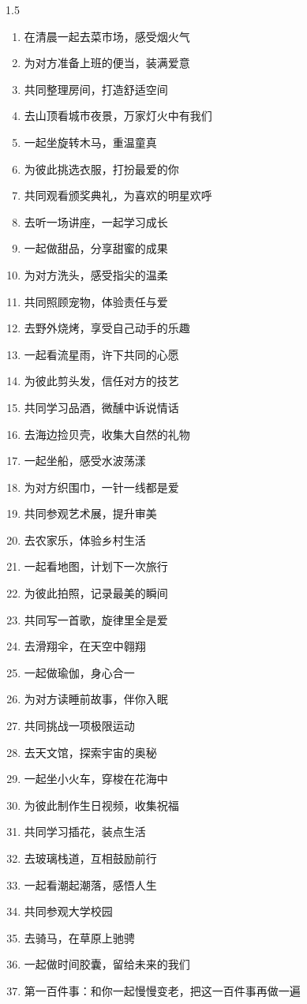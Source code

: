 \begin{spacing}{1.5}
\begin{enumerate}
    \item 在清晨一起去菜市场，感受烟火气
    \item 为对方准备上班的便当，装满爱意
    \item 共同整理房间，打造舒适空间
    \item 去山顶看城市夜景，万家灯火中有我们
    \item 一起坐旋转木马，重温童真
    \item 为彼此挑选衣服，打扮最爱的你
    \item 共同观看颁奖典礼，为喜欢的明星欢呼
    \item 去听一场讲座，一起学习成长
    \item 一起做甜品，分享甜蜜的成果
    \item 为对方洗头，感受指尖的温柔
    \item 共同照顾宠物，体验责任与爱
    \item 去野外烧烤，享受自己动手的乐趣
    \item 一起看流星雨，许下共同的心愿
    \item 为彼此剪头发，信任对方的技艺
    \item 共同学习品酒，微醺中诉说情话
    \item 去海边捡贝壳，收集大自然的礼物
    \item 一起坐船，感受水波荡漾
    \item 为对方织围巾，一针一线都是爱
    \item 共同参观艺术展，提升审美
    \item 去农家乐，体验乡村生活
    \item 一起看地图，计划下一次旅行
    \item 为彼此拍照，记录最美的瞬间
    \item 共同写一首歌，旋律里全是爱
    \item 去滑翔伞，在天空中翱翔
    \item 一起做瑜伽，身心合一
    \item 为对方读睡前故事，伴你入眠
    \item 共同挑战一项极限运动
    \item 去天文馆，探索宇宙的奥秘
    \item 一起坐小火车，穿梭在花海中
    \item 为彼此制作生日视频，收集祝福
    \item 共同学习插花，装点生活
    \item 去玻璃栈道，互相鼓励前行
    \item 一起看潮起潮落，感悟人生
    \item 共同参观大学校园
    \item 去骑马，在草原上驰骋
    \item 一起做时间胶囊，留给未来的我们
    \item 第一百件事：和你一起慢慢变老，把这一百件事再做一遍
\end{enumerate}
\end{spacing}

